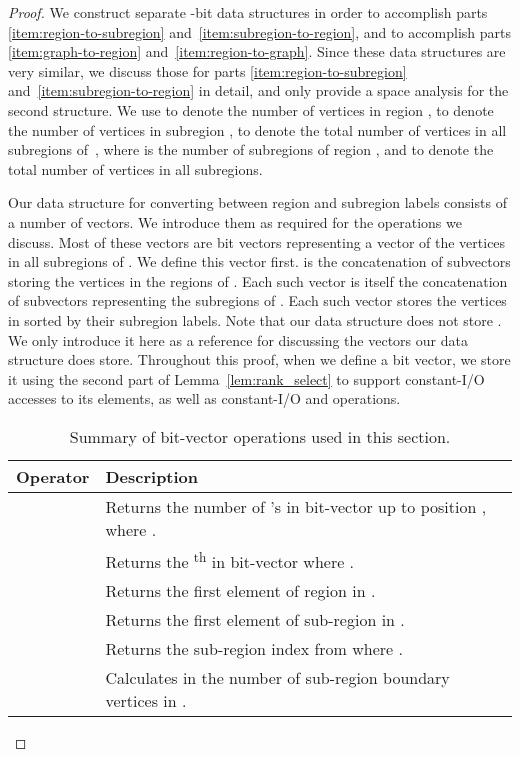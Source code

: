 \begin{proof}
  We construct separate -bit data structures in order to accomplish parts
  \ref{item:region-to-subregion} and~\ref{item:subregion-to-region}, and to
  accomplish parts \ref{item:graph-to-region} and~\ref{item:region-to-graph}.
  Since these data structures are very similar, we discuss those for
  parts \ref{item:region-to-subregion} and~\ref{item:subregion-to-region} in detail,
  and only provide a space analysis for the second structure.
  We use  to denote the number of vertices in region ,
   to denote the number of vertices in subregion ,
   to denote the total number of
  vertices in all subregions of~, where  is the number of
  subregions of region , and  to
  denote the total number of vertices in all subregions.

  Our data structure for converting between region and subregion labels consists
  of a number of vectors.
  We introduce them as required for the operations we discuss.
  Most of these vectors are bit vectors representing a vector 
  of the vertices in all subregions of .
  We define this vector first.
   is the concatenation of  subvectors  storing the vertices in the regions of .
  Each such vector  is itself the concatenation of
  subvectors  representing
  the subregions of .
  Each such vector  stores the vertices in 
  sorted by their subregion labels.
  Note that our data structure does not store .
  We only introduce it here as a reference for discussing the vectors our
  data structure does store.
  Throughout this proof, when we define a bit vector, we store it using
  the second part of Lemma~\ref{lem:rank_select} to support constant-I/O
  accesses to its elements, as well as constant-I/O  and 
  operations.

\begin{table*}[ht]
	\centering
		\begin{tabular}{ l | l}
			Operator & Description \\ \hline
			 & Returns the number of 's in bit-vector  up to
				position , where .\\
			 & Returns the \textsuperscript{th}  in bit-vector 
				where .\\
			 & Returns the first element of region  in . \\
			 & Returns the first element of sub-region 
				in . \\
			 & Returns the sub-region index  from  where
				. \\
			 & Calculates in  the number of sub-region boundary vertices
				in . \\ \hline
		\end{tabular}
	\caption{Summary of bit-vector operations used in this section. }
	\label{tab:succ_operators}
\end{table*}


\end{proof}
